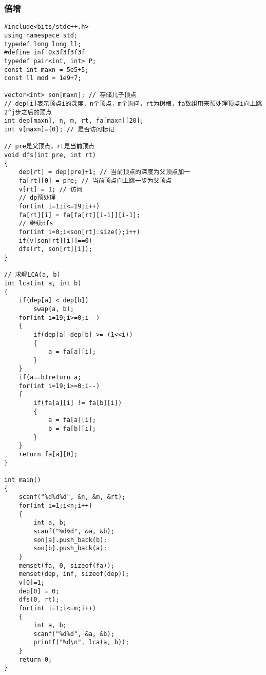 \subsubsection{倍增}
\begin{lstlisting}
#include<bits/stdc++.h>
using namespace std;
typedef long long ll;
#define inf 0x3f3f3f3f
typedef pair<int, int> P;
const int maxn = 5e5+5;
const ll mod = 1e9+7;

vector<int> son[maxn]; // 存储儿子顶点
// dep[i]表示顶点i的深度，n个顶点，m个询问，rt为树根，fa数组用来预处理顶点i向上跳2^j步之后的顶点
int dep[maxn], n, m, rt, fa[maxn][20];
int v[maxn]={0}; // 是否访问标记

// pre是父顶点，rt是当前顶点
void dfs(int pre, int rt)
{
	dep[rt] = dep[pre]+1; // 当前顶点的深度为父顶点加一
	fa[rt][0] = pre; // 当前顶点向上跳一步为父顶点
	v[rt] = 1; // 访问
	// dp预处理
	for(int i=1;i<=19;i++)
	fa[rt][i] = fa[fa[rt][i-1]][i-1];
	// 继续dfs
	for(int i=0;i<son[rt].size();i++)
	if(v[son[rt][i]]==0)
	dfs(rt, son[rt][i]);
}

// 求解LCA(a, b)
int lca(int a, int b)
{
	if(dep[a] < dep[b])
		swap(a, b);
	for(int i=19;i>=0;i--)
	{
		if(dep[a]-dep[b] >= (1<<i))
		{
			a = fa[a][i];
		}
	}
	if(a==b)return a;
	for(int i=19;i>=0;i--)
	{
		if(fa[a][i] != fa[b][i])
		{
			a = fa[a][i];
			b = fa[b][i];
		}
	}
	return fa[a][0];
}

int main()
{
	scanf("%d%d%d", &n, &m, &rt);
	for(int i=1;i<n;i++)
	{
		int a, b;
		scanf("%d%d", &a, &b);
		son[a].push_back(b);
		son[b].push_back(a);
	}
	memset(fa, 0, sizeof(fa));
	memset(dep, inf, sizeof(dep));
	v[0]=1;
	dep[0] = 0;
	dfs(0, rt);
	for(int i=1;i<=m;i++)
	{
		int a, b;
		scanf("%d%d", &a, &b);
		printf("%d\n", lca(a, b));
	}
	return 0;
}
\end{lstlisting}

